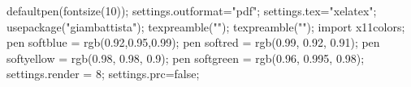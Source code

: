 
\begin{asydef}
defaultpen(fontsize(10));
settings.outformat="pdf";
settings.tex="xelatex";
usepackage("giambattista");
texpreamble("\renewcommand{\vec}[1]{\mathbf{#1}}");
texpreamble("\providecommand{\e}{\mathrm{e}}");
import x11colors;
pen softblue = rgb(0.92,0.95,0.99);
pen softred = rgb(0.99, 0.92, 0.91);
pen softyellow = rgb(0.98, 0.98, 0.9);
pen softgreen = rgb(0.96, 0.995, 0.98);
settings.render = 8;
settings.prc=false;
\end{asydef}

\newsavebox{\asybox}
\def\asydir{asy}

\makeatletter
\def\printauthor{%
  {\large \@author}}
\makeatother

\author{\Large \textit{Samuel S.\ Watson}}

\newcommand{\milink}[3][-7.5mm]{\sidenote{\href{http://mathinsight.org/#2}{\mi} on #3}[#1]}
\newcommand\cocalc[1][-2pt]{\raisebox{#1}{\texttt{[image: figures/cocalc\_new]}}}
\newcommand\tbob[1][-2pt]{\raisebox{#1}{\texttt{[image: figures/3b1b\_new]}}}
\newcommand\mi[1][-2pt]{\raisebox{#1}{\texttt{[image: figures/mathinsight]}}}



\usetikzlibrary{decorations.fractals}

